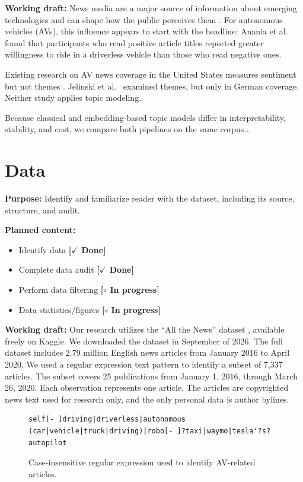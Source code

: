 \documentclass[conference]{IEEEtran}
\newcommand{\done}{\textcolor{green!40!black}{\textbf{[$\checkmark$ Done]}}}
\newcommand{\wip}{\textcolor{orange!70!black}{\textbf{[$\circ$ In progress]}}}
\begin{document}
\textbf{Working draft:}
News media are a major source of information about emerging technologies and can shape how the public perceives them \cite{christen2007media}. For autonomous vehicles (AVs), this influence appears to start with the headline: Anania et
al.~\cite{anania2018effects} found that participants who read positive article titles reported greater willingness to ride in a driverless vehicle than those who read negative ones.

Existing research on AV news coverage in the United States measures sentiment but not themes \cite{penmetsa2023news}. Jelinski et
al.~\cite{jelinski2021undifferentiated} examined themes, but only in
German coverage. Neither study applies topic modeling.

Because classical and embedding-based topic models differ in interpretability, stability, and cost, we compare both pipelines on
the same corpus...

\section*{Data}
\textbf{Purpose:} Identify and familiarize reader with the dataset, including its source, structure, and audit.

\textbf{Planned content:} 
\begin{itemize}
    \item Identify data \done
    \item Complete data audit \done
    \item Perform data filtering \wip
    \item Data statistics/figures \wip
\end{itemize}

\textbf{Working draft:}
Our research utilizes the ``All the News'' dataset \cite{mckinley2021}, available freely on Kaggle. We downloaded the dataset in September of 2026. The full dataset includes 2.79 million English news articles from January 2016 to April 2020. We used a regular expression text pattern to identify a subset of 7,337 articles. The subset covers 25 publications from January 1, 2016, through March 26, 2020. Each observation represents one article. The articles are copyrighted news text used for research only, and the only personal data is author bylines.

\begin{figure}[H]
\centering
\begin{lstlisting}
self[- ]driving|driverless|autonomous (car|vehicle|truck|driving)|robo[- ]?taxi|waymo|tesla'?s? autopilot
\end{lstlisting}
\caption{Case-insensitive regular expression used to identify AV-related articles.}
\label{fig:regex}
\end{figure}
\end{document}
